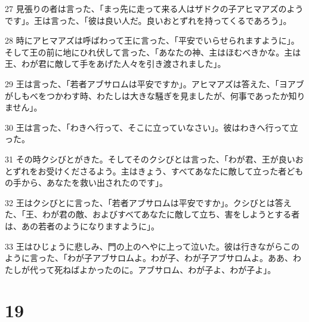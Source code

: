 \par 27 見張りの者は言った、「まっ先に走って来る人はザドクの子アヒマアズのようです」。王は言った、「彼は良い人だ。良いおとずれを持ってくるであろう」。
\par 28 時にアヒマアズは呼ばわって王に言った、「平安でいらせられますように」。そして王の前に地にひれ伏して言った、「あなたの神、主はほむべきかな。主は王、わが君に敵して手をあげた人々を引き渡されました」。
\par 29 王は言った、「若者アブサロムは平安ですか」。アヒマアズは答えた、「ヨアブがしもべをつかわす時、わたしは大きな騒ぎを見ましたが、何事であったか知りません」。
\par 30 王は言った、「わきへ行って、そこに立っていなさい」。彼はわきへ行って立った。
\par 31 その時クシびとがきた。そしてそのクシびとは言った、「わが君、王が良いおとずれをお受けくださるよう。主はきょう、すべてあなたに敵して立った者どもの手から、あなたを救い出されたのです」。
\par 32 王はクシびとに言った、「若者アブサロムは平安ですか」。クシびとは答えた、「王、わが君の敵、およびすべてあなたに敵して立ち、害をしようとする者は、あの若者のようになりますように」。
\par 33 王はひじょうに悲しみ、門の上のへやに上って泣いた。彼は行きながらこのように言った、「わが子アブサロムよ。わが子、わが子アブサロムよ。ああ、わたしが代って死ねばよかったのに。アブサロム、わが子よ、わが子よ」。

\chapter{19}

